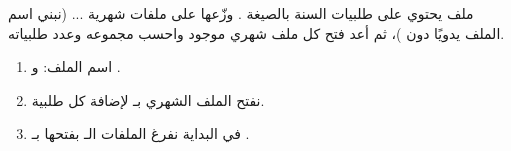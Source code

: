 \begin{statement}
ملف  يحتوي على طلبيات السنة بالصيغة . وزّعها على ملفات شهرية  ...  (نبني اسم الملف يدويًا دون )، ثم أعد فتح كل ملف شهري موجود واحسب مجموعه وعدد طلبياته.
\end{statement}
\begin{stepsbox}\begin{enumerate}
\item اسم الملف:  و .
\item نفتح الملف الشهري بـ  لإضافة كل طلبية.
\item في البداية نفرغ الملفات الـ  بفتحها بـ .
\end{enumerate}\end{stepsbox}

